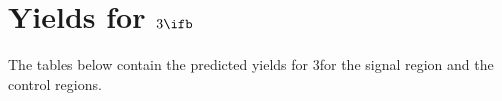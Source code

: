 \clearpage
\section{Yields for $3\ifb$ \label{app:yields3fb}}
The tables below contain the predicted yields for 3\ifb for
the signal region and the control regions.


\newpage

\newpage

\newpage

\newpage

\newpage

\newpage

\newpage
